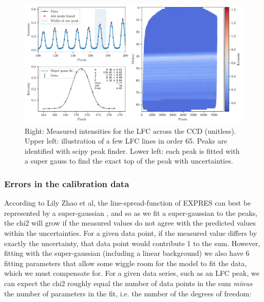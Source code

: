     \begin{figure}%
        \begin{wide}  
            \includegraphics[width=\textwidth]{figures/LFC_peak_fitting_overview.pdf}
            \caption{Right: Measured intensities for the LFC across the CCD (unitless). Upper left: illustration of a few LFC lines in order 65. Peaks are identified with scipy peak finder. Lower left: each peak is fitted with a super gauss to find the exact top of the peak with uncertainties.}
            \label{fig:LFC_CCD}
        \end{wide}
    \end{figure}

    \subsubsection{Errors in the calibration data}

    According to Lily Zhao et al, the line-spread-function of EXPRES can best be represented by a super-gaussian \cite{yale_data}, and so as we fit a super-gaussian to the peaks, the chi2 will grow if the measured values do not agree with the predicted values within the uncertainties. For a given data point, if the measured value differs by exactly the uncertainty, that data point would contribute 1 to the sum. However, fitting with the super-gaussian (including a linear background) we also have 6 fitting parameters that allow some wiggle room for the model to fit the data, which we must compensate for. For a given data series, such as an LFC peak, we can expect the chi2 roughly equal the number of data points in the sum \emph{minus} the number of parameters in the fit, i.e. the number of the degrees of freedom:
    

